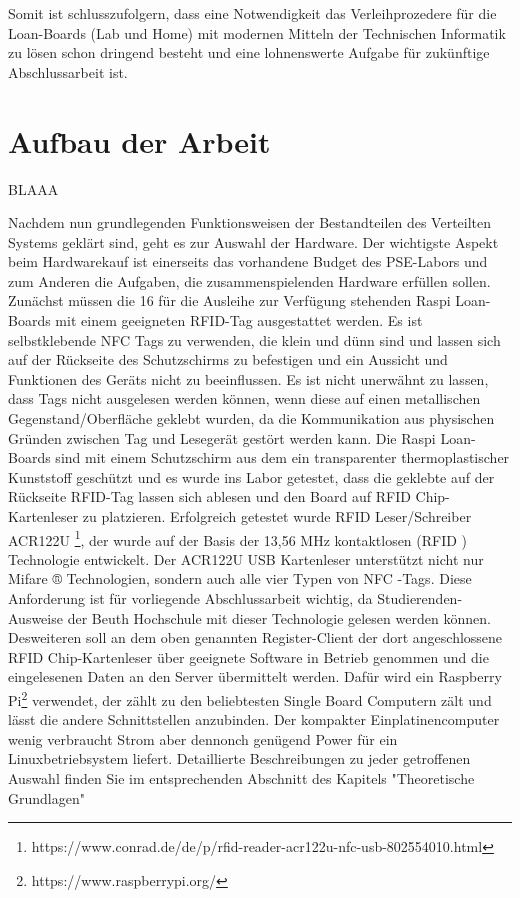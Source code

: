 Somit ist schlusszufolgern, dass eine Notwendigkeit das Verleihprozedere für die Loan-Boards (Lab und Home) mit modernen Mitteln der Technischen Informatik zu lösen schon dringend besteht und eine lohnenswerte Aufgabe für zukünftige Abschlussarbeit ist. 

\section{Aufbau der Arbeit}
\label{sec:intro:themengebiet}
BLAAA 


Nachdem nun grundlegenden Funktionsweisen der Bestandteilen des Verteilten Systems geklärt sind, geht es zur Auswahl der Hardware. Der wichtigste Aspekt beim Hardwarekauf ist einerseits das vorhandene Budget des PSE-Labors und zum Anderen die Aufgaben, die zusammenspielenden Hardware erfüllen sollen. Zunächst müssen die 16 für die Ausleihe zur Verfügung stehenden Raspi Loan-Boards mit einem geeigneten RFID-Tag ausgestattet werden. Es ist selbstklebende NFC Tags zu verwenden, die klein und dünn sind und lassen sich auf der Rückseite des Schutzschirms zu befestigen und ein Aussicht und Funktionen des Geräts nicht zu beeinflussen. Es ist nicht unerwähnt zu lassen, dass Tags nicht ausgelesen werden können, wenn diese auf einen metallischen Gegenstand/Oberfläche geklebt wurden, da die Kommunikation aus physischen Gründen zwischen Tag und Lesegerät gestört werden kann. Die Raspi Loan-Boards sind mit einem Schutzschirm aus dem ein transparenter thermoplastischer Kunststoff geschützt und es wurde ins Labor getestet, dass die geklebte auf der Rückseite RFID-Tag lassen sich ablesen und den Board auf RFID Chip-Kartenleser zu platzieren. Erfolgreich getestet wurde RFID Leser/Schreiber ACR122U \footnote{https://www.conrad.de/de/p/rfid-reader-acr122u-nfc-usb-802554010.html}, der wurde auf der Basis der 13,56 MHz kontaktlosen (RFID ) Technologie entwickelt. Der ACR122U USB Kartenleser unterstützt nicht nur Mifare ® Technologien, sondern auch alle vier Typen von NFC -Tags. Diese Anforderung ist für vorliegende Abschlussarbeit wichtig, da Studierenden-Ausweise der Beuth Hochschule mit dieser Technologie gelesen werden können. Desweiteren soll an dem oben genannten Register-Client der dort angeschlossene RFID Chip-Kartenleser über geeignete Software in Betrieb genommen und die eingelesenen Daten an den Server übermittelt werden. Dafür wird ein Raspberry Pi\footnote{https://www.raspberrypi.org/} verwendet, der zählt zu den beliebtesten Single Board Computern zält und lässt die andere Schnittstellen anzubinden. Der kompakter Einplatinencomputer wenig verbraucht Strom aber dennonch genügend Power für ein Linuxbetriebsystem liefert. Detaillierte Beschreibungen zu jeder getroffenen Auswahl finden Sie im entsprechenden Abschnitt des Kapitels "Theoretische Grundlagen"

 
 